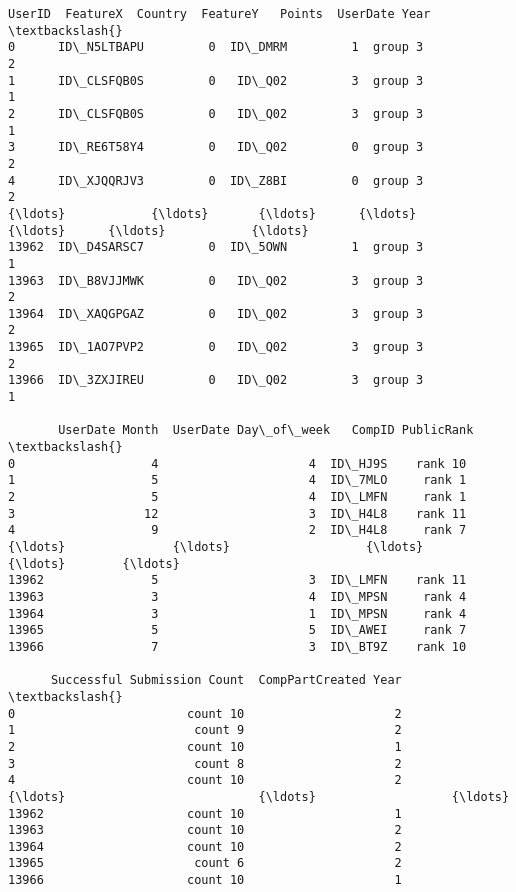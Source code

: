 \documentclass{report}
\makeatletter
\newcommand{\boxspacing}{\kern\kvtcb@left@rule\kern\kvtcb@boxsep}
\newcommand{\prompt}[4]{
        \ttfamily\llap{{\color{#2}[#3]:\hspace{3pt}#4}}\vspace{-\baselineskip}
    }
\makeatother
\begin{document}
            \begin{tcolorbox}[breakable, size=fbox, boxrule=.5pt, pad at break*=1mm, opacityfill=0]
\prompt{Out}{outcolor}{15}{\boxspacing}
\begin{Verbatim}[commandchars=\\\{\}]
            UserID  FeatureX  Country  FeatureY   Points  UserDate Year  \textbackslash{}
0      ID\_N5LTBAPU         0  ID\_DMRM         1  group 3              2
1      ID\_CLSFQB0S         0   ID\_Q02         3  group 3              1
2      ID\_CLSFQB0S         0   ID\_Q02         3  group 3              1
3      ID\_RE6T58Y4         0   ID\_Q02         0  group 3              2
4      ID\_XJQQRJV3         0  ID\_Z8BI         0  group 3              2
{\ldots}            {\ldots}       {\ldots}      {\ldots}       {\ldots}      {\ldots}            {\ldots}
13962  ID\_D4SARSC7         0  ID\_5OWN         1  group 3              1
13963  ID\_B8VJJMWK         0   ID\_Q02         3  group 3              2
13964  ID\_XAQGPGAZ         0   ID\_Q02         3  group 3              2
13965  ID\_1AO7PVP2         0   ID\_Q02         3  group 3              2
13966  ID\_3ZXJIREU         0   ID\_Q02         3  group 3              1

       UserDate Month  UserDate Day\_of\_week   CompID PublicRank  \textbackslash{}
0                   4                     4  ID\_HJ9S    rank 10
1                   5                     4  ID\_7MLO     rank 1
2                   5                     4  ID\_LMFN     rank 1
3                  12                     3  ID\_H4L8    rank 11
4                   9                     2  ID\_H4L8     rank 7
{\ldots}               {\ldots}                   {\ldots}      {\ldots}        {\ldots}
13962               5                     3  ID\_LMFN    rank 11
13963               3                     4  ID\_MPSN     rank 4
13964               3                     1  ID\_MPSN     rank 4
13965               5                     5  ID\_AWEI     rank 7
13966               7                     3  ID\_BT9Z    rank 10

      Successful Submission Count  CompPartCreated Year  \textbackslash{}
0                        count 10                     2
1                         count 9                     2
2                        count 10                     1
3                         count 8                     2
4                        count 10                     2
{\ldots}                           {\ldots}                   {\ldots}
13962                    count 10                     1
13963                    count 10                     2
13964                    count 10                     2
13965                     count 6                     2
13966                    count 10                     1


\end{Verbatim}
\end{tcolorbox}
\end{document}
